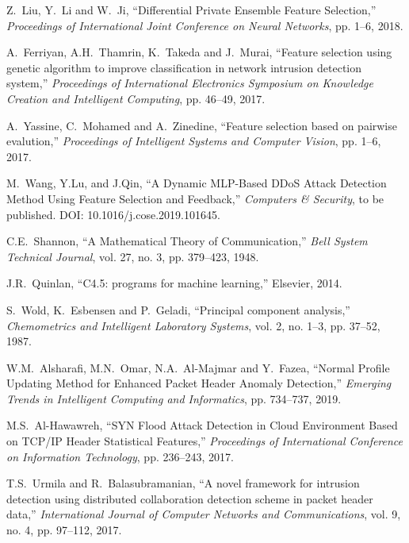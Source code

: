 \documentclass{ieeeaccess}
\theoremstyle{definition}
\begin{document}
\begin{thebibliography}{1}
    Z.~Liu, Y.~Li and W.~Ji, ``Differential Private Ensemble Feature Selection,'' \emph{Proceedings of International Joint Conference on Neural Networks}, pp. 1--6, 2018.

    A.~Ferriyan, A.H.~Thamrin, K.~Takeda and J.~Murai, ``Feature selection using genetic algorithm to improve classification in network intrusion detection system,'' \emph{Proceedings of International Electronics Symposium on Knowledge Creation and Intelligent Computing}, pp. 46--49, 2017.

    A.~Yassine, C.~Mohamed and A.~Zinedine, ``Feature selection based on pairwise evalution,'' \emph{Proceedings of Intelligent Systems and Computer Vision}, pp. 1--6, 2017.

    M.~Wang, Y.Lu, and J.Qin, ``A Dynamic MLP-Based DDoS Attack Detection Method Using Feature Selection and Feedback,'' \emph{Computers \& Security}, to be published. DOI: 10.1016/j.cose.2019.101645.

    C.E.~Shannon, ``A Mathematical Theory of Communication,'' \emph{Bell System Technical Journal}, vol. 27, no. 3, pp. 379--423, 1948.

    J.R.~Quinlan, ``C4.5: programs for machine learning,'' Elsevier, 2014.

    S.~Wold, K.~Esbensen and P.~Geladi, ``Principal component analysis,'' \emph{Chemometrics and Intelligent Laboratory Systems}, vol. 2, no. 1--3, pp. 37--52, 1987.

    W.M.~Alsharafi, M.N.~Omar, N.A.~Al-Majmar and Y.~Fazea, ``Normal Profile Updating Method for Enhanced Packet Header Anomaly Detection,'' \emph{Emerging Trends in Intelligent Computing and Informatics}, pp. 734--737, 2019.

    M.S.~Al-Hawawreh, ``SYN Flood Attack Detection in Cloud Environment Based on TCP/IP Header Statistical Features,'' \emph{Proceedings of International Conference on Information Technology}, pp. 236--243, 2017.

     T.S.~Urmila and R.~Balasubramanian, ``A novel framework for intrusion detection using distributed collaboration detection scheme in packet header data,'' \emph{International Journal of Computer Networks and Communications}, vol. 9, no. 4, pp. 97--112, 2017.

\end{thebibliography}
\end{document}
